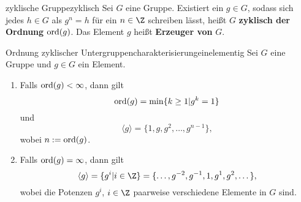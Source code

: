 \begin{definition}{zyklische Gruppe}{zyklisch}
Sei $G$ eine Gruppe. Existiert ein $g\in G$, sodass sich jedes $h \in G$ als $g^n = h$ für ein $n \in \Z$ schreiben lässt, heißt $G$ \textbf{zyklisch der Ordnung} $\operatorname{\text{ord}} (g)$. Das Element $g$ heißt \textbf{Erzeuger von} $G$.
\end{definition}

\begin{satz}{Ordnung zyklischer Untergruppen}{charakterisierungeinelementig}
Sei $G$ eine Gruppe und $g \in G$ ein Element.
\begin{enumerate}
\item Falls $\operatorname{\text{ord}} (g) < \infty$, dann gilt \begin{equation}
\operatorname{\text{ord}} (g) = \min \{k \geq 1 | g^k= 1\}
\end{equation}
und \begin{equation}
\langle g \rangle = \{1, g, g^2, \dots, g^{n-1} \},
\end{equation}
wobei $n := \operatorname{\text{ord}} (g)$.
\item Falls $\operatorname{\text{ord}} (g) = \infty$, dann gilt
\begin{equation}
\langle g \rangle = \{g^i | i \in \Z \} = \{ \dots, g^{-2}, g^{-1}, 1, g^1, g^2, \dots \},
\end{equation}
wobei die Potenzen $g^i$, $i \in \Z$ paarweise verschiedene Elemente in $G$ sind.
\end{enumerate}
\end{satz}
